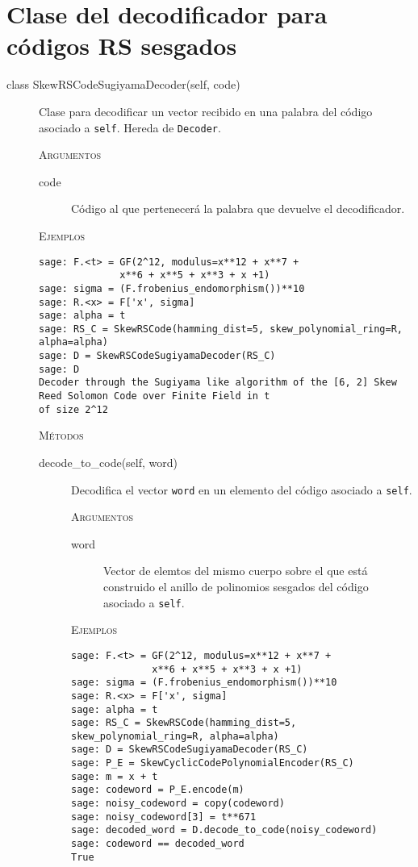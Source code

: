 \section{Clase del decodificador para códigos RS sesgados}
\begin{description}
    \item[class SkewRSCodeSugiyamaDecoder(self, code)]
    Clase para decodificar un vector recibido en una palabra del código asociado a \texttt{self}. Hereda de \texttt{Decoder}.

    \textsc{Argumentos}
    \begin{description}
        \item[code]
        Código al que pertenecerá la palabra que devuelve el decodificador.
    \end{description}

    \textsc{Ejemplos}
    \begin{lstlisting}
sage: F.<t> = GF(2^12, modulus=x**12 + x**7 +
              x**6 + x**5 + x**3 + x +1)
sage: sigma = (F.frobenius_endomorphism())**10
sage: R.<x> = F['x', sigma]
sage: alpha = t
sage: RS_C = SkewRSCode(hamming_dist=5, skew_polynomial_ring=R, alpha=alpha)
sage: D = SkewRSCodeSugiyamaDecoder(RS_C)
sage: D
Decoder through the Sugiyama like algorithm of the [6, 2] Skew Reed Solomon Code over Finite Field in t
of size 2^12
    \end{lstlisting}

    \textsc{Métodos}
    \begin{description}
        \item[decode\_to\_code(self, word)]
        Decodifica el vector \texttt{word} en un elemento del código asociado a \texttt{self}.

        \textsc{Argumentos}
        \begin{description}
            \item[word]
            Vector de elemtos del mismo cuerpo sobre el que está construido el anillo de polinomios
            sesgados del código asociado a \texttt{self}.
        \end{description}

        \textsc{Ejemplos}
        \begin{lstlisting}
sage: F.<t> = GF(2^12, modulus=x**12 + x**7 +
              x**6 + x**5 + x**3 + x +1)
sage: sigma = (F.frobenius_endomorphism())**10
sage: R.<x> = F['x', sigma]
sage: alpha = t
sage: RS_C = SkewRSCode(hamming_dist=5, skew_polynomial_ring=R, alpha=alpha)
sage: D = SkewRSCodeSugiyamaDecoder(RS_C)
sage: P_E = SkewCyclicCodePolynomialEncoder(RS_C)
sage: m = x + t
sage: codeword = P_E.encode(m)
sage: noisy_codeword = copy(codeword)
sage: noisy_codeword[3] = t**671
sage: decoded_word = D.decode_to_code(noisy_codeword)
sage: codeword == decoded_word
True
        \end{lstlisting}


\end{description}
\end{description}
